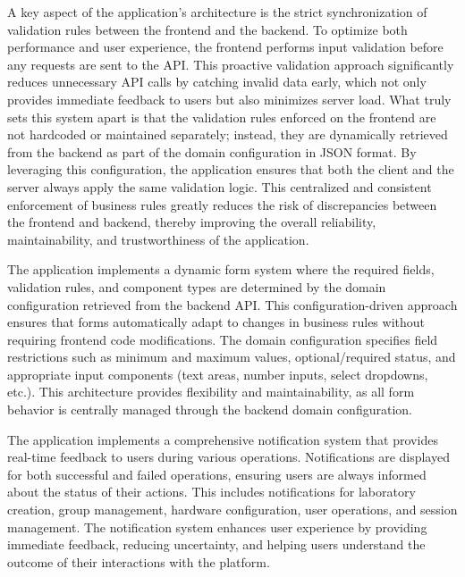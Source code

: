 A key aspect of the application's architecture is the strict synchronization of validation rules between the frontend and the backend. To optimize both performance and user experience, the frontend performs input validation before any requests are sent to the API. This proactive validation approach significantly reduces unnecessary API calls by catching invalid data early, which not only provides immediate feedback to users but also minimizes server load. What truly sets this system apart is that the validation rules enforced on the frontend are not hardcoded or maintained separately; instead, they are dynamically retrieved from the backend as part of the domain configuration in JSON format. By leveraging this configuration, the application ensures that both the client and the server always apply the same validation logic. This centralized and consistent enforcement of business rules greatly reduces the risk of discrepancies between the frontend and backend, thereby improving the overall reliability, maintainability, and trustworthiness of the application.

The application implements a dynamic form system where the required fields, validation rules, and component types are determined by the domain configuration retrieved from the backend API. This configuration-driven approach ensures that forms automatically adapt to changes in business rules without requiring frontend code modifications. The domain configuration specifies field restrictions such as minimum and maximum values, optional/required status, and appropriate input components (text areas, number inputs, select dropdowns, etc.). This architecture provides flexibility and maintainability, as all form behavior is centrally managed through the backend domain configuration.

The application implements a comprehensive notification system that provides real-time feedback to users during various operations. Notifications are displayed for both successful and failed operations, ensuring users are always informed about the status of their actions. This includes notifications for laboratory creation, group management, hardware configuration, user operations, and session management. The notification system enhances user experience by providing immediate feedback, reducing uncertainty, and helping users understand the outcome of their interactions with the platform.

